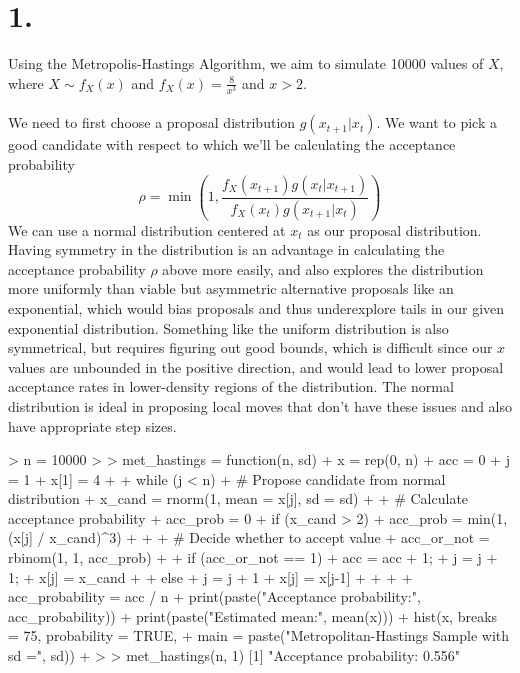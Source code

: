 \documentclass{article}
\begin{document}
\thispagestyle{firstpageheader}
{\Large 

\section*{1.}

Using the Metropolis-Hastings Algorithm, we aim to simulate 10000 values of \(X\), where \(X \sim f_X(x)\) and \(f_X(x)  = \frac{8}{x^3}\) and \(x > 2\). \\ \\
We need to first choose a proposal distribution \(g(x_{t+1} | x_t)\). We want to pick a good candidate with respect to which we'll be calculating the acceptance probability 
\[
  \rho = \min(1, \frac{f_X(x_{t+1})g(x_t | x_{t+1})}{f_X(x_t) g(x_{t+1} | x_t)})
\]
We can use a normal distribution centered at \(x_t\) as our proposal distribution. Having symmetry in the distribution is an advantage in calculating the acceptance probability \(\rho\) above more easily, and also explores the distribution more uniformly than viable but asymmetric alternative proposals like an exponential, which would bias proposals and thus underexplore tails in our given exponential distribution. Something like the uniform distribution is also symmetrical, but requires figuring out good bounds, which is difficult since our \(x\) values are unbounded in the positive direction, and would lead to lower proposal acceptance rates in lower-density regions of the distribution. The normal distribution is ideal in proposing local moves that don't have these issues and also have appropriate step sizes. 
\begin{spverbatim}
> n = 10000
> 
> met_hastings = function(n, sd) {
+   x = rep(0, n)
+   acc = 0
+   j = 1
+   x[1] = 4
+   
+   while (j < n) {
+     # Propose candidate from normal distribution
+     x_cand = rnorm(1, mean = x[j], sd = sd)
+     
+     # Calculate acceptance probability
+     acc_prob = 0
+     if (x_cand > 2) {
+       acc_prob = min(1, (x[j] / x_cand)^3)
+     }
+     
+     # Decide whether to accept value 
+     acc_or_not = rbinom(1, 1, acc_prob)
+     
+     if (acc_or_not == 1) {
+       acc = acc + 1;
+       j = j + 1;
+       x[j] = x_cand
+     }
+     else {
+       j = j + 1
+       x[j] = x[j-1]
+     }	
+   }
+   
+   acc_probability = acc / n
+   print(paste("Acceptance probability:", acc_probability))
+   print(paste("Estimated mean:", mean(x)))
+   hist(x, breaks = 75, probability = TRUE,
+        main = paste("Metropolitan-Hastings Sample with sd =", sd))
+ }
> 
> met_hastings(n, 1)
[1] "Acceptance probability: 0.556"

\end{spverbatim}}
\end{document}
